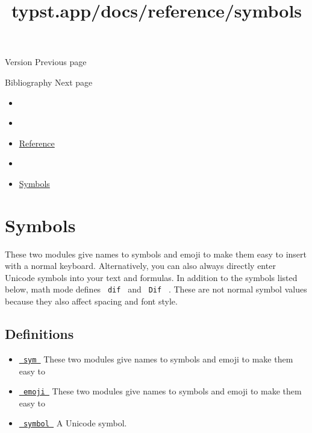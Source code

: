 \href{/docs/reference/foundations/version/}{\pandocbounded{}}

{ Version } { Previous page }

\href{/docs/reference/model/bibliography/}{\pandocbounded{}}

{ Bibliography } { Next page }


\title{typst.app/docs/reference/symbols}

\begin{itemize}
\tightlist
\item
  \href{/docs}{}
\item
  
\item
  \href{/docs/reference/}{Reference}
\item
  
\item
  \href{/docs/reference/symbols/}{Symbols}
\end{itemize}

\section{Symbols}\label{summary}

These two modules give names to symbols and emoji to make them easy to
insert with a normal keyboard. Alternatively, you can also always
directly enter Unicode symbols into your text and formulas. In addition
to the symbols listed below, math mode defines \texttt{\ dif\ } and
\texttt{\ Dif\ } . These are not normal symbol values because they also
affect spacing and font style.

\subsection{Definitions}\label{definitions}

\begin{itemize}
\tightlist
\item
  \href{/docs/reference/symbols/sym/}{\texttt{\ sym\ }} { These two
  modules give names to symbols and emoji to make them easy to }
\item
  \href{/docs/reference/symbols/emoji/}{\texttt{\ emoji\ }} { These two
  modules give names to symbols and emoji to make them easy to }
\item
  \href{/docs/reference/symbols/symbol/}{\texttt{\ symbol\ }} { A
  Unicode symbol. }
\end{itemize}

